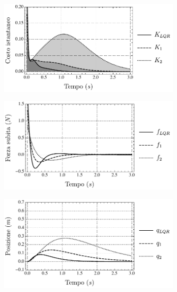 \begin{figure}
    \centering
    \begin{subfigure}[t]{.48\textwidth}
        \centering
        \includegraphics[width=\textwidth]{assets/opt1}
    \end{subfigure}
\hfill
    \begin{subfigure}[t]{.48\textwidth}
        \centering
        \includegraphics[width=\textwidth]{assets/opt2}
    \end{subfigure}

    \begin{subfigure}[b]{.48\textwidth}
        \centering
        \includegraphics[width=\textwidth]{assets/opt3}
    \end{subfigure}


\end{figure}
